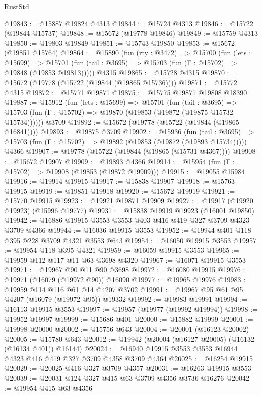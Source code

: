 \begin{lexlean}{RustStd}
\begin{coremodule}
@19843 := @15887 @19824 @4313
@19844 := @15724 @4313
@19846 := @15722 (@19844 @15737)
@19848 := @15672 (@19778 @19846)
@19849 := @15759 @4313
@19850 := @19803 @19849
@19851 := @15743 @19850
@19853 := @15672 (@19851 @15764)
@19864 := @15890
    (fun (rty : @3472) =>
    @15700
      (fun (lets : @15699) =>
      @15701 (fun (tail : @3695) => @15703 (fun (Γ : @15702) => @19848 (@19853 @19813)))))
    @4315
@19865 := @15728 @4315
@19870 := @15672 (@19778 (@15722 (@19844 (@19865 @15736))))
@19871 := @15772 @4315
@19872 := @15771 @19871
@19875 := @15775 @19871 @19808 @18390
@19887 := @15912
    (fun (lets : @15699) =>
    @15701
      (fun (tail : @3695) =>
      @15703 (fun (Γ : @15702) => @19870 (@19853 (@19872 (@19875 @15732 @15734))))))
    @3709
@19892 := @15672 (@19778 (@15722 (@19844 (@19865 @16841))))
@19893 := @19875 @3709
@19902 := @15936
    (fun (tail : @3695) => @15703 (fun (Γ : @15702) => @19892 (@19853 (@19872 (@19893 @15734)))))
    @4366
@19907 := @19778 (@15722 (@19844 (@19865 (@15731 @4367))))
@19908 := @15672 @19907
@19909 := @19893 @4366
@19914 := @15954 (fun (Γ : @15702) => @19908 (@19853 (@19872 @19909)))
@19915 := @19055 @15984
@19916 := @19914 @19915
@19917 := @15838 @19907
@19918 := @15763 @19915
@19919 := @19851 @19918
@19920 := @15672 @19919
@19921 := @15770 @19915
@19923 := @19921 @19871 @19909
@19927 := @19917 (@19920 @19923) (@15996 @19777)
@19931 := @15838 @19919 @19923 (@16001 @19850)
@19942 := @16886 @19915 @3553 @3553 @403 @416 @419 @327 @3709 @4323 @3709 @4366
@19944 := @16036 @19915 @3553
@19952 := @19944 @401 @118 @395 @228 @3709 @4321 @3553 @643
@19954 := @16050 @19915 @3553
@19957 := @19954 @118 @395 @4321
@19959 := @16059 @19915 @3553
@19965 := @19959 @112 @117 @11 @63 @3698 @4320
@19967 := @16071 @19915 @3553
@19971 := @19967 @90 @11 @90 @3698
@19972 := @16080 @19915
@19976 := @19971 (@16079 (@19972 @90)) @16090
@19977 := @19965 @19976
@19983 := @19959 @114 @116 @61 @14 @4207 @3702
@19991 := @19967 @95 @61 @95 @4207 (@16079 (@19972 @95)) @19332
@19992 := @19983 @19991
@19994 := @16113 @19915 @3553
@19997 := @19957 (@19977 (@19992 @19994))
@19998 := @19952 @19997
@19999 := @15686 @401
@20000 := @15882 @19999
@20001 := @19998 @20000
@20002 := @15756 @643
@20004 := @20001 (@16123 @20002)
@20005 := @15780 @643
@20012 := @19942 (@20004 (@16127 @20005) (@16132 (@16134 @401)) @16144)
@20024 := @16940 @19915 @3553 @3553 @16944 @4323 @416 @419 @327 @3709 @4358 @3709 @4364
@20025 := @16254 @19915
@20029 := @20025 @416 @327 @3709 @4357
@20031 := @16263 @19915 @3553
@20039 := @20031 @124 @327 @415 @63 @3709 @4356 @3736 @16276
@20042 := @19954 @415 @63 @4356

\end{coremodule}
\end{lexlean}
